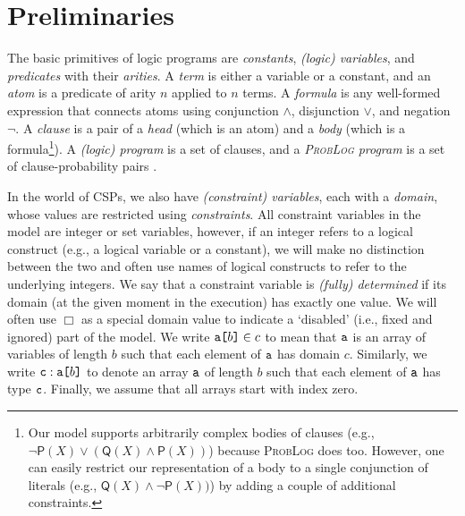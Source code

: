 \documentclass[runningheads]{llncs}
\newcommand{\variable}[1]{\texttt{\textup{#1}}}
\newcommand{\arrayd}[3]{\variable{{#1}[}{#2}\variable{]} \in {#3}}
\newcommand{\arrayt}[3]{\variable{{#3}} : \variable{{#1}[}{#2}\variable{]}}
\begin{document}
\section{Preliminaries}

The basic primitives of logic programs are \emph{constants}, \emph{(logic)
  variables}, and \emph{predicates} with their \emph{arities}. A \emph{term} is
either a variable or a constant, and an \emph{atom} is a predicate of arity $n$
applied to $n$ terms. A \emph{formula} is any well-formed expression that
connects atoms using conjunction $\land$, disjunction $\lor$, and negation
$\neg$. A \emph{clause} is a pair of a \emph{head} (which is an atom) and a
\emph{body} (which is a formula\footnote{Our model supports arbitrarily complex
  bodies of clauses (e.g., $\neg\mathsf{P}(X) \lor (\mathsf{Q}(X) \land
  \mathsf{P}(X))$) because \textsc{ProbLog} does too. However, one can easily
  restrict our representation of a body to a single conjunction of literals
  (e.g., $\mathsf{Q}(X) \land \neg\mathsf{P}(X))$) by adding a couple of
  additional constraints.}). A \emph{(logic) program} is a set of clauses, and a
\emph{\textsc{ProbLog} program} is a set of clause-probability pairs
\cite{DBLP:journals/tplp/FierensBRSGTJR15}.

In the world of CSPs, we also have \emph{(constraint) variables}, each with a
\emph{domain}, whose values are restricted using \emph{constraints}. All
constraint variables in the model are integer or set variables, however, if an
integer refers to a logical construct (e.g., a logical variable or a constant),
we will make no distinction between the two and often use names of logical
constructs to refer to the underlying integers. We say that a constraint
variable is \emph{(fully) determined} if its domain (at the given moment in the
execution) has exactly one value. We will often use $\Box$ as a special domain
value to indicate a `disabled' (i.e., fixed and ignored) part of the model. We
write $\arrayd{a}{b}{c}$ to mean that $\variable{a}$ is an array of variables of
length $b$ such that each element of $\variable{a}$ has domain $c$. Similarly,
we write $\arrayt{a}{b}{c}$ to denote an array $\variable{a}$ of length $b$ such
that each element of $\variable{a}$ has type $\variable{c}$. Finally, we assume
that all arrays start with index zero.
\end{document}
